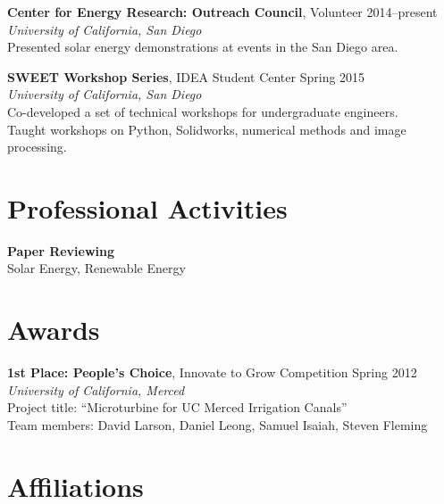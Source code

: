 \documentclass[]{res}
\begin{document}
\begin{resume}
\textbf{Center for Energy Research: Outreach Council}, Volunteer \hfill 2014--present \\
\textit{University of California, San Diego} \\
Presented solar energy demonstrations at events in the San Diego area.

\textbf{SWEET Workshop Series}, IDEA Student Center \hfill Spring 2015 \\
\textit{University of California, San Diego} \\
Co-developed a set of technical workshops for undergraduate engineers. \\
Taught workshops on Python, Solidworks, numerical methods and image processing.


\section{Professional Activities}
\vspace{0.1in}

\textbf{Paper Reviewing} \\
Solar Energy, Renewable Energy


%
\section{Awards}
\vspace{0.1in}

\textbf{1st Place: People's Choice}, Innovate to Grow Competition \hfill Spring 2012 \\
\textit{University of California, Merced} \\
Project title: ``Microturbine for UC Merced Irrigation Canals'' \\
Team members: David Larson, Daniel Leong, Samuel Isaiah, Steven Fleming


\section{Affiliations}
\vspace{0.1in}


\end{resume}
\end{document}
